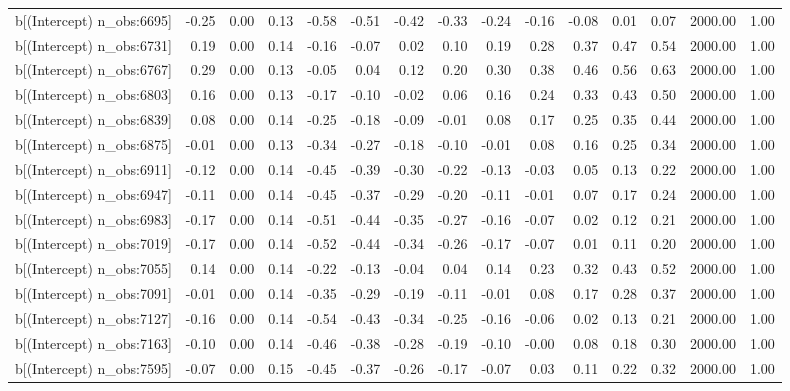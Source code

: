 \begin{table}[ht]
\begin{tabular}{rrrrrrrrrrrrrrr}
  b[(Intercept) n\_obs:6695] & -0.25 & 0.00 & 0.13 & -0.58 & -0.51 & -0.42 & -0.33 & -0.24 & -0.16 & -0.08 & 0.01 & 0.07 & 2000.00 & 1.00 \\ 
  b[(Intercept) n\_obs:6731] & 0.19 & 0.00 & 0.14 & -0.16 & -0.07 & 0.02 & 0.10 & 0.19 & 0.28 & 0.37 & 0.47 & 0.54 & 2000.00 & 1.00 \\ 
  b[(Intercept) n\_obs:6767] & 0.29 & 0.00 & 0.13 & -0.05 & 0.04 & 0.12 & 0.20 & 0.30 & 0.38 & 0.46 & 0.56 & 0.63 & 2000.00 & 1.00 \\ 
  b[(Intercept) n\_obs:6803] & 0.16 & 0.00 & 0.13 & -0.17 & -0.10 & -0.02 & 0.06 & 0.16 & 0.24 & 0.33 & 0.43 & 0.50 & 2000.00 & 1.00 \\ 
  b[(Intercept) n\_obs:6839] & 0.08 & 0.00 & 0.14 & -0.25 & -0.18 & -0.09 & -0.01 & 0.08 & 0.17 & 0.25 & 0.35 & 0.44 & 2000.00 & 1.00 \\ 
  b[(Intercept) n\_obs:6875] & -0.01 & 0.00 & 0.13 & -0.34 & -0.27 & -0.18 & -0.10 & -0.01 & 0.08 & 0.16 & 0.25 & 0.34 & 2000.00 & 1.00 \\ 
  b[(Intercept) n\_obs:6911] & -0.12 & 0.00 & 0.14 & -0.45 & -0.39 & -0.30 & -0.22 & -0.13 & -0.03 & 0.05 & 0.13 & 0.22 & 2000.00 & 1.00 \\ 
  b[(Intercept) n\_obs:6947] & -0.11 & 0.00 & 0.14 & -0.45 & -0.37 & -0.29 & -0.20 & -0.11 & -0.01 & 0.07 & 0.17 & 0.24 & 2000.00 & 1.00 \\ 
  b[(Intercept) n\_obs:6983] & -0.17 & 0.00 & 0.14 & -0.51 & -0.44 & -0.35 & -0.27 & -0.16 & -0.07 & 0.02 & 0.12 & 0.21 & 2000.00 & 1.00 \\ 
  b[(Intercept) n\_obs:7019] & -0.17 & 0.00 & 0.14 & -0.52 & -0.44 & -0.34 & -0.26 & -0.17 & -0.07 & 0.01 & 0.11 & 0.20 & 2000.00 & 1.00 \\ 
  b[(Intercept) n\_obs:7055] & 0.14 & 0.00 & 0.14 & -0.22 & -0.13 & -0.04 & 0.04 & 0.14 & 0.23 & 0.32 & 0.43 & 0.52 & 2000.00 & 1.00 \\ 
  b[(Intercept) n\_obs:7091] & -0.01 & 0.00 & 0.14 & -0.35 & -0.29 & -0.19 & -0.11 & -0.01 & 0.08 & 0.17 & 0.28 & 0.37 & 2000.00 & 1.00 \\ 
  b[(Intercept) n\_obs:7127] & -0.16 & 0.00 & 0.14 & -0.54 & -0.43 & -0.34 & -0.25 & -0.16 & -0.06 & 0.02 & 0.13 & 0.21 & 2000.00 & 1.00 \\ 
  b[(Intercept) n\_obs:7163] & -0.10 & 0.00 & 0.14 & -0.46 & -0.38 & -0.28 & -0.19 & -0.10 & -0.00 & 0.08 & 0.18 & 0.30 & 2000.00 & 1.00 \\ 
  b[(Intercept) n\_obs:7595] & -0.07 & 0.00 & 0.15 & -0.45 & -0.37 & -0.26 & -0.17 & -0.07 & 0.03 & 0.11 & 0.22 & 0.32 & 2000.00 & 1.00 \\ 

\end{tabular}
\end{table}
